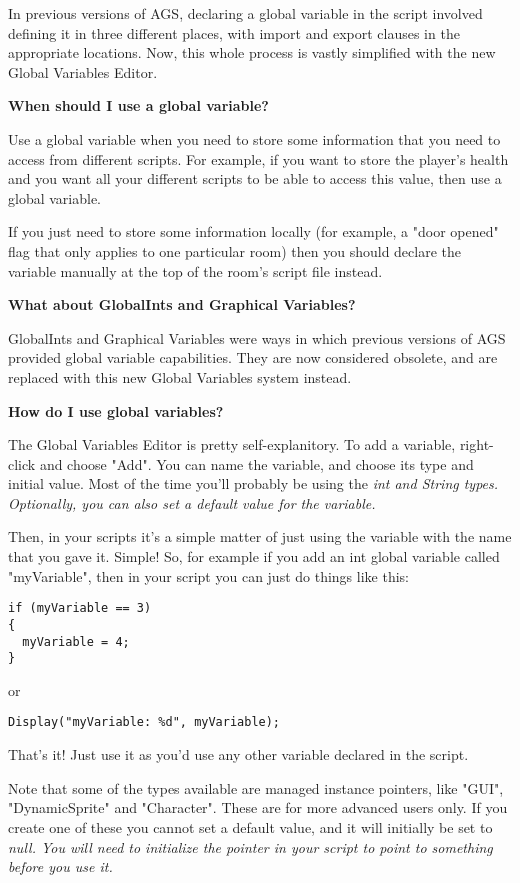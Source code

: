 In previous versions of AGS, declaring a global variable in the script involved
defining it in three different places, with import and export clauses in the
appropriate locations. Now, this whole process is vastly simplified with the new
Global Variables Editor.

\bf{When should I use a global variable?}

Use a global variable when you need to store some information that you need
to access from different scripts. For example, if you want to store the player's
health and you want all your different scripts to be able to access this value,
then use a global variable.

If you just need to store some information locally (for example, a "door opened" flag
that only applies to one particular room) then you should declare the variable
manually at the top of the room's script file instead.

\bf{What about GlobalInts and Graphical Variables?}

GlobalInts and Graphical Variables were ways in which previous versions of AGS
provided global variable capabilities. They are now considered obsolete, and are
replaced with this new Global Variables system instead.

\bf{How do I use global variables?}

The Global Variables Editor is pretty self-explanitory. To add a variable, right-click
and choose "Add". You can name the variable, and choose its type and initial value.
Most of the time you'll probably be using the \it{int} and \it{String} types. Optionally,
you can also set a default value for the variable.

Then, in your scripts it's a simple matter of just using the variable with the name
that you gave it. Simple! So, for example if you add an int global variable called
"myVariable", then in your script you can just do things like this:

\begin{verbatim}
if (myVariable == 3)
{
  myVariable = 4;
}
\end{verbatim}

or

\verb$Display("myVariable: %d", myVariable);$

That's it! Just use it as you'd use any other variable declared in the script.

Note that some of the types available are managed instance pointers, like "GUI",
"DynamicSprite" and "Character". These are for more advanced users only.
If you create one of these you cannot set a default value, and it will initially
be set to \it{null}. You will need to initialize the pointer in your script to
point to something before you use it.


